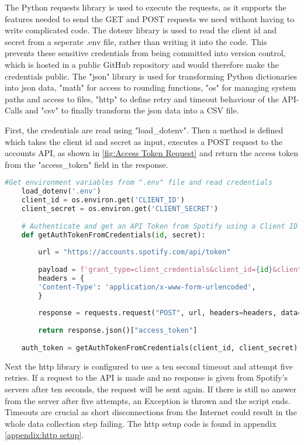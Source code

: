 The Python requests library is used to execute the requests, as it supports the features needed to send the GET and POST
requests we need without having to write complicated code.
The dotenv library is used to read the client id and secret from a seperate .env file, rather than writing it into the code.
This prevents these sensitive credentials from being committed into version control,
which is hosted in a public GitHub repository and would therefore make the credentials public.
The "json" library is used for transforming Python dictionaries into json data, "math" for access to rounding functions,
"os" for managing system paths and access to files, "http" to define retry and timeout behaviour of the API-Calls and "csv"
to finally transform the json data into a CSV file.

First, the credentials are read using "load\_dotenv". Then a method is defined which takes the client id and secret as input,
executes a POST request to the accounts API, as shown in \ref{fig:Access Token Request} and return the access token from the
"access\_token" field in the response. 

\begin{lstlisting}[language=Python]
    #Get environment variables from ".env" file and read credentials
    load_dotenv('.env')
    client_id = os.environ.get('CLIENT_ID')
    client_secret = os.environ.get('CLIENT_SECRET')
    
    # Authenticate and get an API Token from Spotify using a Client ID and secret
    def getAuthTokenFromCredentials(id, secret):
    
        url = "https://accounts.spotify.com/api/token"
    
        payload = f'grant_type=client_credentials&client_id={id}&client_secret={secret}'
        headers = {
        'Content-Type': 'application/x-www-form-urlencoded',
        }
    
        response = requests.request("POST", url, headers=headers, data=payload)
    
        return response.json()["access_token"]
    
    auth_token = getAuthTokenFromCredentials(client_id, client_secret)
\end{lstlisting} 

Next the http library is configured to use a ten second timeout and attempt five retries. If a request to the API is made
and no response is given from Spotify's servers after ten seconds, the request will be sent again. If there is still no
answer from the server after five attempts, an Exception is thrown and the script ends.
Timeouts are crucial as short disconnections from the Internet could result in the whole data collection step failing.
The http setup code is found in appendix \ref{appendix:http setup}.

